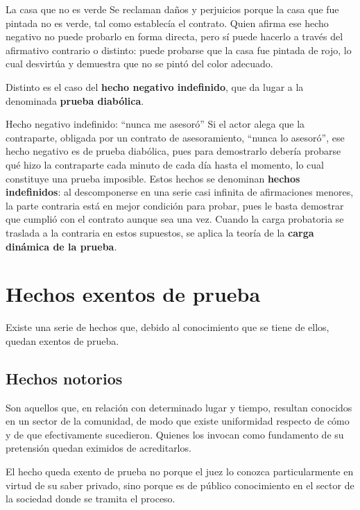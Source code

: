 \documentclass[12pt,oneside]{book}
\begin{document}
\begin{example}{La casa que no es verde}
Se reclaman daños y perjuicios porque la casa que fue pintada no es verde, tal como establecía el contrato. Quien afirma ese hecho negativo no puede probarlo en forma directa, pero sí puede hacerlo a través del afirmativo contrario o distinto: puede probarse que la casa fue pintada de rojo, lo cual desvirtúa y demuestra que no se pintó del color adecuado.
\end{example}

Distinto es el caso del \textbf{hecho negativo indefinido}, que da lugar a la denominada \textbf{prueba diabólica}.

\begin{example}{Hecho negativo indefinido: ``nunca me asesoró''}
Si el actor alega que la contraparte, obligada por un contrato de asesoramiento, ``nunca lo asesoró'', ese hecho negativo es de prueba diabólica, pues para demostrarlo debería probarse qué hizo la contraparte cada minuto de cada día hasta el momento, lo cual constituye una prueba imposible. Estos hechos se denominan \textbf{hechos indefinidos}: al descomponerse en una serie casi infinita de afirmaciones menores, la parte contraria está en mejor condición para probar, pues le basta demostrar que cumplió con el contrato aunque sea una vez. Cuando la carga probatoria se traslada a la contraria en estos supuestos, se aplica la teoría de la \textbf{carga dinámica de la prueba}.
\end{example}

\section{Hechos exentos de prueba}

Existe una serie de hechos que, debido al conocimiento que se tiene de ellos, quedan exentos de prueba.

\subsection{Hechos notorios}

Son aquellos que, en relación con determinado lugar y tiempo, resultan conocidos en un sector de la comunidad, de modo que existe uniformidad respecto de cómo y de que efectivamente sucedieron. Quienes los invocan como fundamento de su pretensión quedan eximidos de acreditarlos.

El hecho queda exento de prueba no porque el juez lo conozca particularmente en virtud de su saber privado, sino porque es de público conocimiento en el sector de la sociedad donde se tramita el proceso.
\end{document}
